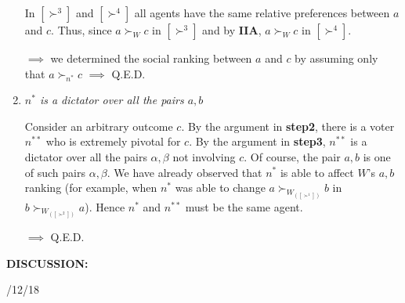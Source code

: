 \documentclass[pt11,a4paper,twoside,reqno,openright]{paper}
\begin{document}
\begin{enumerate}
	\noindent In $[\succ^3]$ and $[\succ^4]$ all agents have the same relative 
	preferences between $a$ and $c$. Thus, since $a \succ_W c$ in $[\succ^3]$ 
	and by \textbf{IIA}, $a \succ_W c$ in $[\succ^4]$. 

	\noindent $\implies$ we determined the social ranking between $a$ and $c$ 
	by assuming only that $a \succ_{n^*} c$ $\implies$ Q.E.D.

	\item \textit{$n^*$ is a dictator over all the pairs $a,b$}

	\noindent Consider an arbitrary outcome $c$. By the argument in 
	\textbf{step2}, there is a voter $n^{**}$ who is extremely pivotal for $c$. 
	By the argument in \textbf{step3}, $n^{**}$ is a dictator over all the pairs 
	$\alpha,\beta$ not involving $c$. Of course, the pair $a,b$ is one of such 
	pairs $\alpha,\beta$. We have already observed that $n^*$ is able to affect 
	$W$'s $a,b$ ranking (for example, when $n^*$ was able to change 
	$a \succ_{W_{([\succ^1])}} b$ in $b \succ_{W_{([\succ^2])}} a$). Hence $n^*$ and 
	$n^{**}$ must be the same agent.

	\noindent $\implies$ Q.E.D.
\end{enumerate}

\bigskip
\noindent \textbf{DISCUSSION:}

/12/18
\end{document}
